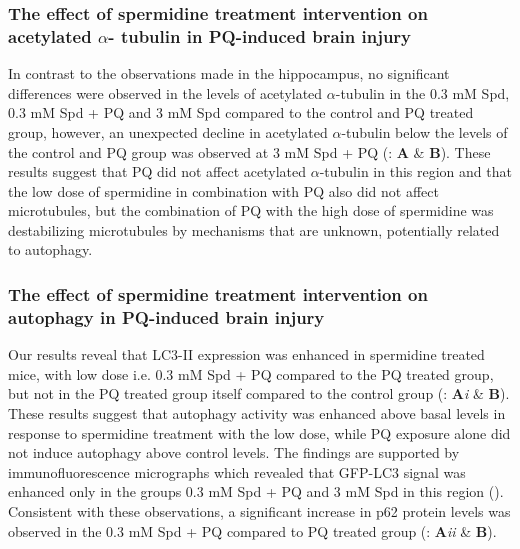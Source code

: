 \subsubsection{The effect of spermidine treatment intervention on acetylated $\alpha$- tubulin in PQ-induced brain injury}
In contrast to the observations made in the hippocampus, no significant differences were observed in the levels of acetylated $\alpha$-tubulin in the 0.3 mM Spd, 0.3 mM Spd + PQ and 3 mM Spd compared to the control and PQ treated group, however, an unexpected decline in acetylated $\alpha$-tubulin below the levels of the control and PQ group was observed at 3 mM Spd + PQ (: \textbf{A} \& \textbf{B}). These results suggest that PQ did not affect acetylated $\alpha$-tubulin in this region and that the low dose of spermidine in combination with PQ also did not affect microtubules, but the combination of PQ with the high dose of spermidine was destabilizing microtubules by mechanisms that are unknown, potentially related to autophagy. 

\subsubsection{The effect of spermidine treatment intervention on autophagy in PQ-induced brain injury}
Our results reveal that LC3-II expression was enhanced in spermidine treated mice, with low dose i.e. 0.3 mM Spd + PQ compared to the PQ treated group, but not in the PQ treated group itself compared to the control group (: \textbf{A}\textit{i} \& \textbf{B}). These results suggest that autophagy activity was enhanced above basal levels in response to spermidine treatment with the low dose, while PQ exposure alone did not induce autophagy above control levels. The findings are supported by immunofluorescence micrographs which revealed that GFP-LC3 signal was enhanced only in the groups 0.3 mM Spd + PQ and 3 mM Spd in this region (). Consistent with these observations, a significant increase in p62 protein levels was observed in the 0.3 mM Spd + PQ compared to PQ treated group (: \textbf{A}\textit{ii} \& \textbf{B}). 


